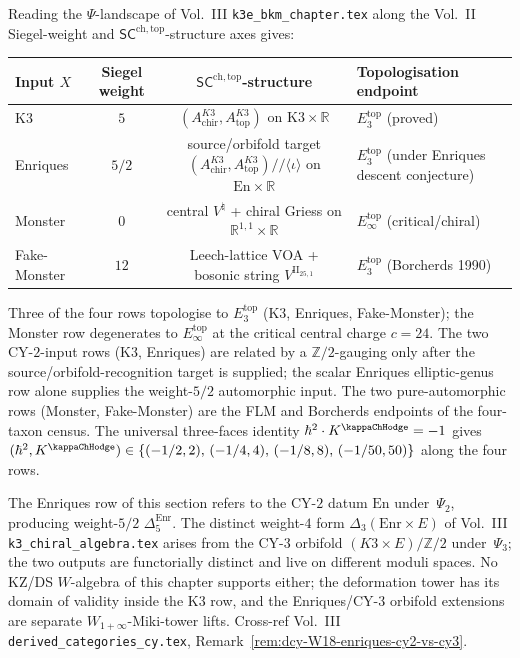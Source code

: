 \begin{remark}
\label{rem:wac-W18-four-row-landscape}
Reading the $\Psi$-landscape of Vol.~III
\texttt{k3e\_bkm\_chapter.tex} along the Vol.~II
Siegel-weight and $\mathsf{SC}^{\mathrm{ch,top}}$-structure axes
gives:
\begin{center}
\begin{tabular}{lccl}
\toprule
Input $X$ & Siegel weight & $\mathsf{SC}^{\mathrm{ch,top}}$-structure &
 Topologisation endpoint \\
\midrule
K3 & $5$ & $(A^{K3}_{\mathrm{chir}}, A^{K3}_{\mathrm{top}})$ on
 $\mathrm{K3}\times\mathbb{R}$ & $E_3^{\mathrm{top}}$
 (proved) \\
Enriques & $5/2$ &
 source/orbifold target
 $(A^{K3}_{\mathrm{chir}}, A^{K3}_{\mathrm{top}})/\!/\langle\iota\rangle$
 on $\mathrm{En}\times\mathbb{R}$ & $E_3^{\mathrm{top}}$
 (under Enriques descent conjecture) \\
Monster & $0$ & central $V^{\natural}$ + chiral Griess
 on $\mathbb{R}^{1,1}\times\mathbb{R}$ & $E_\infty^{\mathrm{top}}$
 (critical/chiral) \\
Fake-Monster & $12$ & Leech-lattice VOA + bosonic string
 $V^{\mathrm{II}_{25,1}}$ & $E_3^{\mathrm{top}}$ (Borcherds 1990) \\
\bottomrule
\end{tabular}
\end{center}
Three of the four rows topologise to $E_3^{\mathrm{top}}$
(K3, Enriques, Fake-Monster); the Monster row degenerates to
$E_\infty^{\mathrm{top}}$ at the critical central charge
$c = 24$. The two CY-$2$-input rows (K3, Enriques) are related by a
$\mathbb{Z}/2$-gauging only after the source/orbifold-recognition target
is supplied; the scalar Enriques elliptic-genus row alone supplies the
weight-$5/2$ automorphic input. The two pure-automorphic rows (Monster,
Fake-Monster) are the FLM and Borcherds endpoints of the four-taxon
census. The universal three-faces identity
$\hbar^2\cdot K^{\kappaChHodge} = -1$ gives
$(\hbar^2, K^{\kappaChHodge})
\in \{(-1/2, 2),\, (-1/4, 4),\, (-1/8, 8),\, (-1/50, 50)\}$
along the four rows.
\end{remark}

\begin{remark}
\label{rem:wac-W18-enriques-cy2-vs-cy3}
The Enriques row of this section refers to the CY-$2$ datum
$\mathrm{En}$ under~$\Psi_2$, producing weight-$5/2$
$\Delta_5^{\mathrm{Enr}}$. The distinct weight-$4$ form
$\Delta_3(\mathrm{Enr}\times E)$ of
Vol.~III \texttt{k3\_chiral\_algebra.tex} arises from the CY-$3$
orbifold $(K3\times E)/\mathbb{Z}/2$ under~$\Psi_3$; the two
outputs are functorially distinct and live on different
moduli spaces. No KZ/DS $W$-algebra of this chapter
supports either; the deformation tower has its domain of
validity inside the K3 row, and the Enriques/CY-$3$
orbifold extensions are separate
$W_{1+\infty}$-Miki-tower lifts. Cross-ref
Vol.~III \texttt{derived\_categories\_cy.tex},
Remark~\ref{rem:dcy-W18-enriques-cy2-vs-cy3}.
\end{remark}
